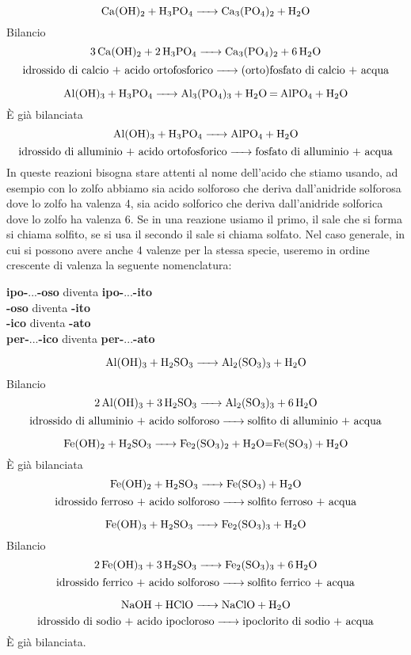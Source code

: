 $$\ce{Ca(OH)_2 + H_3PO_4 -> Ca_3(PO_4)_2 + H_2O}$$Bilancio
$$\ce{3 Ca(OH)_2 + 2 H_3PO_4 -> Ca_3(PO_4)_2 + 6 H_2O}$$
$$\text{idrossido di calcio + acido ortofosforico} \ce{->} \text{(orto)fosfato di calcio + acqua}$$

$$\ce{Al(OH)_3 + H_3PO_4 -> Al_3(PO_4)_3 + H_2O = AlPO_4 + H_2O}$$È già bilanciata
$$\ce{Al(OH)_3 + H_3PO_4 -> AlPO_4 + H_2O}$$
$$\text{idrossido di alluminio + acido ortofosforico} \ce{->} \text{fosfato di alluminio + acqua}$$
In queste reazioni bisogna stare attenti al nome dell'acido che stiamo usando, ad esempio con lo zolfo abbiamo sia acido solforoso  che deriva dall'anidride solforosa  dove lo zolfo ha valenza 4, sia acido solforico  che deriva dall'anidride solforica  dove lo zolfo ha valenza 6. Se in una reazione usiamo il primo, il sale che si forma si chiama solfito, se si usa il secondo il sale si chiama solfato. Nel caso generale, in cui si possono avere anche 4 valenze per la stessa specie, useremo in ordine crescente di valenza la seguente nomenclatura:
\begin{center}
\textbf{ipo-}...\textbf{-oso} diventa \textbf{ipo-}...\textbf{-ito}\\
\textbf{-oso} diventa \textbf{-ito}\\
\textbf{-ico} diventa \textbf{-ato}\\
\textbf{per-}...\textbf{-ico} diventa \textbf{per-}...\textbf{-ato}
\end{center}


$$\ce{Al(OH)_3 + H_2SO_3 -> Al_2(SO_3)_3 + H_2O}$$Bilancio
$$\ce{2 Al(OH)_3 + 3 H_2SO_3 -> Al_2(SO_3)_3 + 6 H_2O}$$
$$\text{idrossido di alluminio + acido solforoso} \ce{->} \text{solfito di alluminio + acqua}$$

$$\ce{Fe(OH)_2 + H_2SO_3 -> Fe_2(SO_3)_2 + H_2O=Fe(SO_3) + H_2O}$$È già bilanciata
$$\ce{Fe(OH)_2 + H_2SO_3 -> Fe(SO_3) + H_2O}$$
$$\text{idrossido ferroso + acido solforoso} \ce{->} \text{solfito ferroso + acqua}$$

$$\ce{Fe(OH)_3 + H_2SO_3 -> Fe_2(SO_3)_3 + H_2O}$$Bilancio
$$\ce{2 Fe(OH)_3 + 3 H_2SO_3 -> Fe_2(SO_3)_3 + 6 H_2O}$$
$$\text{idrossido ferrico + acido solforoso} \ce{->} \text{solfito ferrico + acqua}$$

$$\ce{NaOH + HClO -> NaClO + H_2O}$$
$$\text{idrossido di sodio + acido ipocloroso}\ce{->}\text{ipoclorito di sodio + acqua}$$
È già bilanciata.

